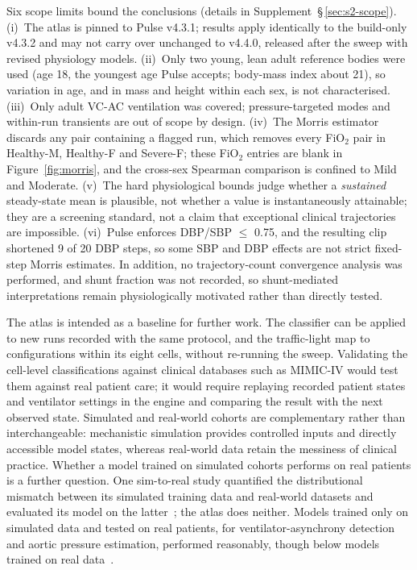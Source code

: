 \documentclass[pdflatex,sn-nature]{sn-jnl}%
\begin{document}
Six scope limits bound the conclusions (details in Supplement~\S\,\ref{sec:s2-scope}). (i)~The atlas is pinned to Pulse v4.3.1; results apply identically to the build-only v4.3.2 and may not carry over unchanged to v4.4.0, released after the sweep with revised physiology models. (ii)~Only two young, lean adult reference bodies were used (age 18, the youngest age Pulse accepts; body-mass index about 21), so variation in age, and in mass and height within each sex, is not characterised. (iii)~Only adult VC-AC ventilation was covered; pressure-targeted modes and within-run transients are out of scope by design. (iv)~The Morris estimator discards any pair containing a flagged run, which removes every FiO$_2$ pair in Healthy-M, Healthy-F and Severe-F; these FiO$_2$ entries are blank in Figure~\ref{fig:morris}, and the cross-sex Spearman comparison is confined to Mild and Moderate. (v)~The hard physiological bounds judge whether a \emph{sustained} steady-state mean is plausible, not whether a value is instantaneously attainable; they are a screening standard, not a claim that exceptional clinical trajectories are impossible. (vi)~Pulse enforces DBP/SBP $\leq$ 0.75, and the resulting clip shortened 9 of 20 DBP steps, so some SBP and DBP effects are not strict fixed-step Morris estimates. In addition, no trajectory-count convergence analysis was performed, and shunt fraction was not recorded, so shunt-mediated interpretations remain physiologically motivated rather than directly tested.

The atlas is intended as a baseline for further work. The classifier can be applied to new runs recorded with the same protocol, and the traffic-light map to configurations within its eight cells, without re-running the sweep. Validating the cell-level classifications against clinical databases such as MIMIC-IV would test them against real patient care; it would require replaying recorded patient states and ventilator settings in the engine and comparing the result with the next observed state. Simulated and real-world cohorts are complementary rather than interchangeable: mechanistic simulation provides controlled inputs and directly accessible model states, whereas real-world data retain the messiness of clinical practice. Whether a model trained on simulated cohorts performs on real patients is a further question. One sim-to-real study quantified the distributional mismatch between its simulated training data and real-world datasets and evaluated its model on the latter~\cite{hwang2025sim2real}; the atlas does neither. Models trained only on simulated data and tested on real patients, for ventilator-asynchrony detection and aortic pressure estimation, performed reasonably, though below models trained on real data~\cite{bakkes2023asynchrony,bikia2020aortic}.
\end{document}
